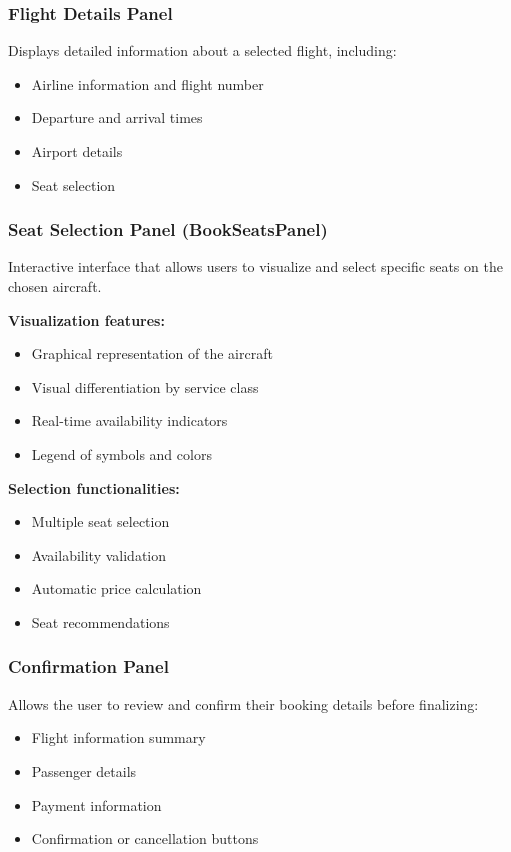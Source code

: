 \documentclass[conference]{IEEEtran}
\begin{document}
    \subsubsection{Flight Details Panel}
    Displays detailed information about a selected flight, including:
    \begin{itemize}
        \item Airline information and flight number
        \item Departure and arrival times
        \item Airport details
        \item Seat selection
    \end{itemize}

    \subsubsection{Seat Selection Panel (BookSeatsPanel)}
    Interactive interface that allows users to visualize and select specific seats on the chosen aircraft.

    \textbf{Visualization features:}
    \begin{itemize}
        \item Graphical representation of the aircraft
        \item Visual differentiation by service class
        \item Real-time availability indicators
        \item Legend of symbols and colors
    \end{itemize}

    \textbf{Selection functionalities:}
    \begin{itemize}
        \item Multiple seat selection
        \item Availability validation
        \item Automatic price calculation
        \item Seat recommendations
    \end{itemize}

    \subsubsection{Confirmation Panel}
    Allows the user to review and confirm their booking details before finalizing:
    \begin{itemize}
        \item Flight information summary
        \item Passenger details
        \item Payment information
        \item Confirmation or cancellation buttons
    \end{itemize}
\end{document}
